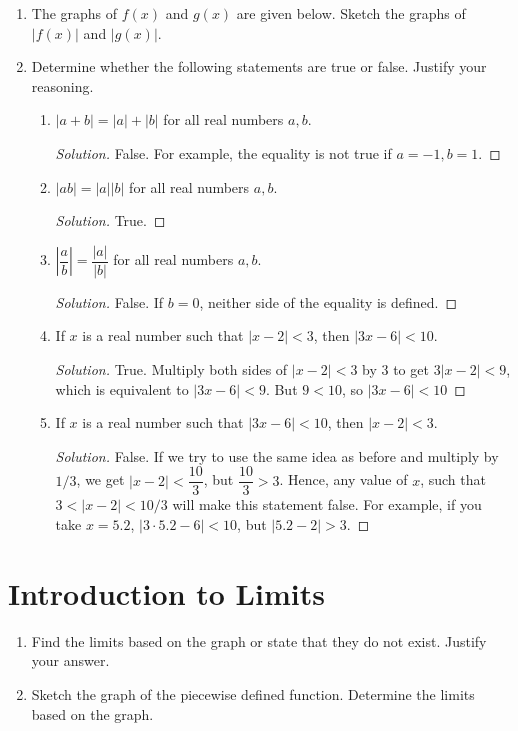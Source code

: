 \documentclass[12pt]{article}
\newenvironment{solution}{\begin{proof}[Solution]}{\end{proof}}
\begin{document}
\begin{enumerate}
		\item The graphs of $f(x)$ and $g(x)$ are given below. Sketch the graphs of $|f(x)|$ and $|g(x)|$.
		\item Determine whether the following statements are true or false. Justify your reasoning.
		\begin{enumerate}
			\item $|a+b|=|a|+|b|$ for all real numbers $a,b$.
			\begin{solution}
				False. For example, the equality is not true if $a=-1, b=1$.
			\end{solution}
			\item $|ab|=|a||b|$ for all real numbers $a,b$.
			\begin{solution}
				True. 
			\end{solution}
			\item $\left|\dfrac{a}{b}\right|=\dfrac{|a|}{|b|}$ for all real numbers $a,b$.
			\begin{solution}
				False. If $b=0$, neither side of the equality is defined.
			\end{solution}
			\item If $x$ is a real number such that $|x-2|<3$, then $|3x-6|<10$.
			\begin{solution}
				True. Multiply both sides of $|x-2|<3$ by $3$ to get $3|x-2|<9$, which is equivalent to $|3x-6|<9$. But $9<10$, so $|3x-6|<10$
			\end{solution}
			\item If $x$ is a real number such that $|3x-6|<10$, then $|x-2|<3$.
			\begin{solution}
				False. If we try to use the same idea as before and multiply by $1/3$, we get $|x-2|<\dfrac{10}{3}$, but $\dfrac{10}{3}>3$. Hence, any value of $x$, such that $3<|x-2|<10/3$ will make this statement false. For example, if you take $x=5.2$, $|3\cdot 5.2-6|<10$, but $|5.2-2|>3$.
			\end{solution}
		\end{enumerate}
		
	\end{enumerate}
	

	

	

	

	
	\section{Introduction to Limits}
	\begin{enumerate}
		\item Find the limits based on the graph or state that they do not exist. Justify your answer.
		\item Sketch the graph of the piecewise defined function. Determine the limits based on the graph.
	\end{enumerate}
	
\end{document}
